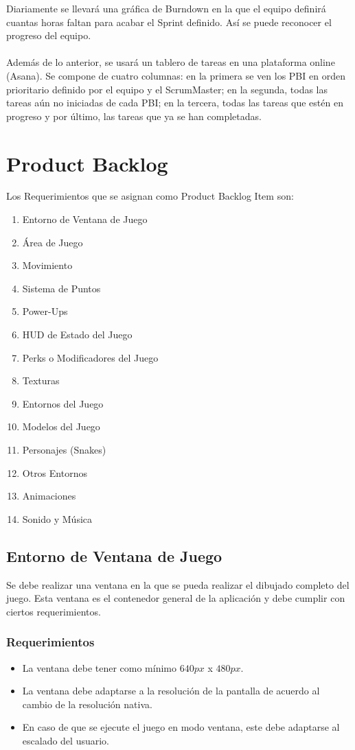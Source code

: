 \documentclass[letterpaper]{scrreprt}
\begin{document}
Diariamente se llevará una gráfica de Burndown en la que el equipo definirá cuantas horas faltan para acabar el Sprint definido. Así se puede reconocer el progreso del equipo.
\\
\\ Además de lo anterior, se usará un tablero de tareas en una plataforma online (Asana). Se compone de cuatro columnas: en la primera se ven los PBI en orden prioritario definido por el equipo y el ScrumMaster; en la segunda, todas las tareas aún no iniciadas de cada PBI; en la tercera, todas las tareas que estén en progreso y por último, las tareas que ya se han completadas.



\chapter{Product Backlog} 
Los Requerimientos que se asignan como Product Backlog Item son:
\begin{enumerate}
	\item  Entorno de Ventana de Juego
	\item Área de Juego
	\item  Movimiento
	\item Sistema de Puntos
	\item Power-Ups
	\item HUD de Estado del Juego
	\item Perks o Modificadores del Juego
	\item Texturas
	\item Entornos del Juego
	\item Modelos del Juego
	\item Personajes (Snakes)
	\item Otros Entornos
	\item Animaciones
	\item Sonido y Música
\end{enumerate}

\section{Entorno de Ventana de Juego}
Se debe realizar una ventana en la que se pueda realizar el dibujado completo del juego. Esta ventana es el contenedor general de la aplicación y debe cumplir con ciertos requerimientos.

\subsection{Requerimientos}
\begin{itemize}
	\item La ventana debe tener como mínimo $640px$ x $480px$.
	\item La ventana debe adaptarse a la resolución de la pantalla de acuerdo al cambio de la resolución nativa.
	\item En caso de que se ejecute el juego en modo ventana, este debe adaptarse al escalado del usuario.
\end{itemize}
\end{document}
